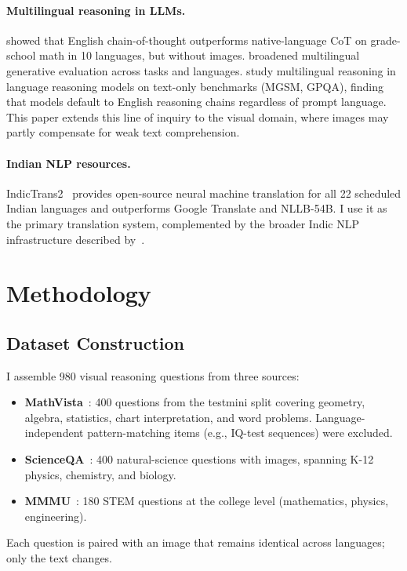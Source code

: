 \documentclass[11pt,a4paper]{article}
\begin{document}
\paragraph{Multilingual reasoning in LLMs.}
\citet{shi2023mgsm} showed that English chain-of-thought outperforms native-language CoT on grade-school math in 10 languages, but without images.
\citet{ahuja2023mega} broadened multilingual generative evaluation across tasks and languages.
\citet{saji2025reasoning} study multilingual reasoning in language reasoning models on text-only benchmarks (MGSM, GPQA), finding that models default to English reasoning chains regardless of prompt language.
This paper extends this line of inquiry to the visual domain, where images may partly compensate for weak text comprehension.

\paragraph{Indian NLP resources.}
IndicTrans2~\citep{gala2023indictrans2} provides open-source neural machine translation for all 22 scheduled Indian languages and outperforms Google Translate and NLLB-54B.
I use it as the primary translation system, complemented by the broader Indic NLP infrastructure described by~\citet{doddapaneni2023towards}.


\section{Methodology}
\label{sec:method}

\subsection{Dataset Construction}

I assemble 980 visual reasoning questions from three sources:
\begin{itemize}[nosep,leftmargin=1.5em]
\item \textbf{MathVista}~\citep{lu2024mathvista}: 400 questions from the testmini split covering geometry, algebra, statistics, chart interpretation, and word problems.  Language-independent pattern-matching items (e.g., IQ-test sequences) were excluded.
\item \textbf{ScienceQA}~\citep{lu2022scienceqa}: 400 natural-science questions with images, spanning K-12 physics, chemistry, and biology.
\item \textbf{MMMU}~\citep{yue2024mmmu}: 180 STEM questions at the college level (mathematics, physics, engineering).
\end{itemize}
Each question is paired with an image that remains identical across languages; only the text changes.
\end{document}
